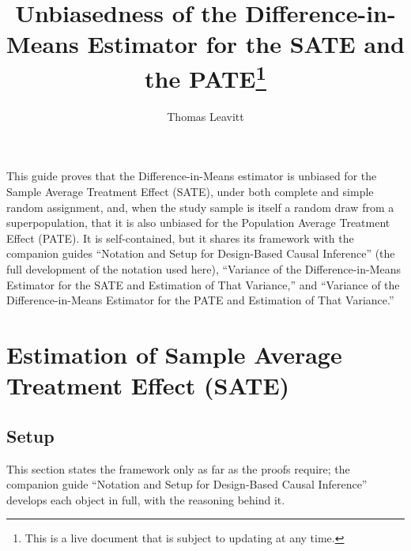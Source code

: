 \documentclass[12pt,leqno]{article}
\theoremstyle{newstyle}
\begin{document}
\title{Unbiasedness of the Difference-in-Means Estimator for the SATE and the PATE\thanks{This is a live document that is subject to updating at any time.}}
\author{Thomas Leavitt}
\date{}
\maketitle

This guide proves that the Difference-in-Means estimator is unbiased for the Sample Average Treatment Effect (SATE), under both complete and simple random assignment, and, when the study sample is itself a random draw from a superpopulation, that it is also unbiased for the Population Average Treatment Effect (PATE). It is self-contained, but it shares its framework with the companion guides \enquote{Notation and Setup for Design-Based Causal Inference} (the full development of the notation used here), \enquote{Variance of the Difference-in-Means Estimator for the SATE and Estimation of That Variance,} and \enquote{Variance of the Difference-in-Means Estimator for the PATE and Estimation of That Variance.}

\section{Estimation of Sample Average Treatment Effect (SATE)}

\subsection{Setup} \label{sec: SATE setup}

This section states the framework only as far as the proofs require; the companion guide \enquote{Notation and Setup for Design-Based Causal Inference} develops each object in full, with the reasoning behind it.
\end{document}
